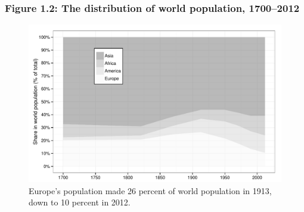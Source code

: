 \documentclass[t]{beamer}\usepackage[]{graphicx}\usepackage[]{color}
\newenvironment{knitrout}{}{} %
\begin{document}
\begin{frame}[label=Figure_1_2b]
\frametitle{Figure 1.2: The distribution of world population, 1700--2012}
\begin{figure}[t]
\begin{minipage}[b]{\textwidth}
\centering
\begin{knitrout}\footnotesize
{}\color{fgcolor}

{\centering \includegraphics[width=1\linewidth]{figures/bw/Figure_1_2b} 

}



\end{knitrout}
\caption{Europe's population made 26 percent of world population in 1913, down to 10 percent in 2012.}
\end{minipage}
\end{figure}
\end{frame}
\end{document}
